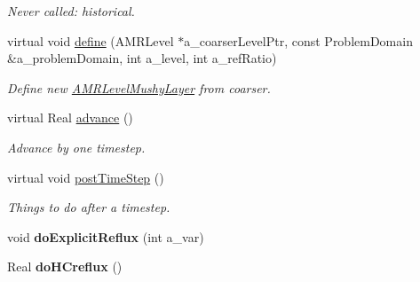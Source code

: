 \begin{DoxyCompactItemize}
\begin{DoxyCompactList}\small\item\em Never called\-: historical. \end{DoxyCompactList}\item 
\hypertarget{class_a_m_r_level_mushy_layer_a1ed163b80b24d3dc053097d24dc55be5}{virtual void \hyperlink{class_a_m_r_level_mushy_layer_a1ed163b80b24d3dc053097d24dc55be5}{define} (A\-M\-R\-Level $\ast$a\-\_\-coarser\-Level\-Ptr, const Problem\-Domain \&a\-\_\-problem\-Domain, int a\-\_\-level, int a\-\_\-ref\-Ratio)}\label{class_a_m_r_level_mushy_layer_a1ed163b80b24d3dc053097d24dc55be5}

\begin{DoxyCompactList}\small\item\em Define new \hyperlink{class_a_m_r_level_mushy_layer}{A\-M\-R\-Level\-Mushy\-Layer} from coarser. \end{DoxyCompactList}\item 
\hypertarget{class_a_m_r_level_mushy_layer_aa303a6233d0a9cf8701035e98e6d028d}{virtual Real \hyperlink{class_a_m_r_level_mushy_layer_aa303a6233d0a9cf8701035e98e6d028d}{advance} ()}\label{class_a_m_r_level_mushy_layer_aa303a6233d0a9cf8701035e98e6d028d}

\begin{DoxyCompactList}\small\item\em Advance by one timestep. \end{DoxyCompactList}\item 
\hypertarget{class_a_m_r_level_mushy_layer_a9c9c444cc77e9f623ddc9132ee4bc532}{virtual void \hyperlink{class_a_m_r_level_mushy_layer_a9c9c444cc77e9f623ddc9132ee4bc532}{post\-Time\-Step} ()}\label{class_a_m_r_level_mushy_layer_a9c9c444cc77e9f623ddc9132ee4bc532}

\begin{DoxyCompactList}\small\item\em Things to do after a timestep. \end{DoxyCompactList}\item 
\hypertarget{class_a_m_r_level_mushy_layer_a296b5accca2569adda4f91b90f0213e0}{void {\bfseries do\-Explicit\-Reflux} (int a\-\_\-var)}\label{class_a_m_r_level_mushy_layer_a296b5accca2569adda4f91b90f0213e0}

\item 
\hypertarget{class_a_m_r_level_mushy_layer_ad6c20b4a85790c49eab030f6909a0a0b}{Real {\bfseries do\-H\-Creflux} ()}\label{class_a_m_r_level_mushy_layer_ad6c20b4a85790c49eab030f6909a0a0b}


\end{DoxyCompactItemize}
